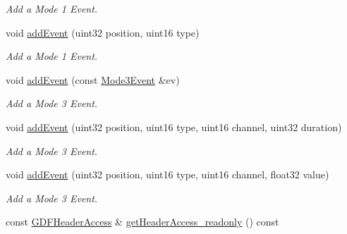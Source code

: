 \begin{DoxyCompactItemize}
\begin{DoxyCompactList}\small\item\em Add a Mode 1 Event. \item\end{DoxyCompactList}\item 
\hypertarget{classgdf_1_1_writer_a74395664e8920e69c02808f53bf517e0}{
void \hyperlink{classgdf_1_1_writer_a74395664e8920e69c02808f53bf517e0}{addEvent} (uint32 position, uint16 type)}
\label{classgdf_1_1_writer_a74395664e8920e69c02808f53bf517e0}

\begin{DoxyCompactList}\small\item\em Add a Mode 1 Event. \item\end{DoxyCompactList}\item 
\hypertarget{classgdf_1_1_writer_a32c1f5eb7c4c560705ce994d9463f987}{
void \hyperlink{classgdf_1_1_writer_a32c1f5eb7c4c560705ce994d9463f987}{addEvent} (const \hyperlink{structgdf_1_1_mode3_event}{Mode3Event} \&ev)}
\label{classgdf_1_1_writer_a32c1f5eb7c4c560705ce994d9463f987}

\begin{DoxyCompactList}\small\item\em Add a Mode 3 Event. \item\end{DoxyCompactList}\item 
\hypertarget{classgdf_1_1_writer_a51041a8a46a997d869b91737d03ea44f}{
void \hyperlink{classgdf_1_1_writer_a51041a8a46a997d869b91737d03ea44f}{addEvent} (uint32 position, uint16 type, uint16 channel, uint32 duration)}
\label{classgdf_1_1_writer_a51041a8a46a997d869b91737d03ea44f}

\begin{DoxyCompactList}\small\item\em Add a Mode 3 Event. \item\end{DoxyCompactList}\item 
\hypertarget{classgdf_1_1_writer_a20d82ae706287503b98205f7a23b0a8e}{
void \hyperlink{classgdf_1_1_writer_a20d82ae706287503b98205f7a23b0a8e}{addEvent} (uint32 position, uint16 type, uint16 channel, float32 value)}
\label{classgdf_1_1_writer_a20d82ae706287503b98205f7a23b0a8e}

\begin{DoxyCompactList}\small\item\em Add a Mode 3 Event. \item\end{DoxyCompactList}\item 
\hypertarget{classgdf_1_1_writer_a24400dc06cda7e3de52f62b32fd3e42e}{
const \hyperlink{classgdf_1_1_g_d_f_header_access}{GDFHeaderAccess} \& \hyperlink{classgdf_1_1_writer_a24400dc06cda7e3de52f62b32fd3e42e}{getHeaderAccess\_\-readonly} () const }
\label{classgdf_1_1_writer_a24400dc06cda7e3de52f62b32fd3e42e}


\end{DoxyCompactItemize}
